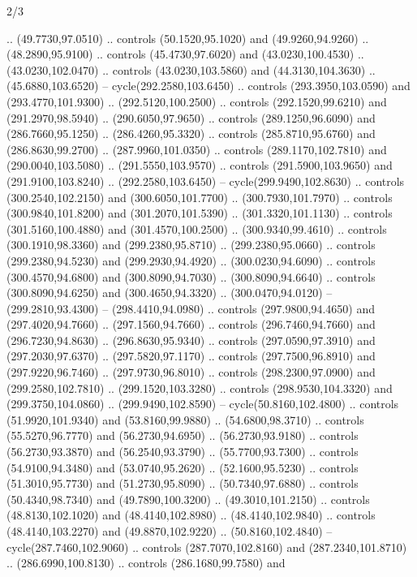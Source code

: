 \begin{flagdescription}{2/3}
\begin{scope}[xshift=0.5\flaglength,yshift=0.5\flagwidth,scale=\stretchfactor]
\begin{scope}[scale=0.001645\flagwidth,yshift=65mm,xshift=-63mm]
\begin{scope}[y=0.80pt, x=0.80pt, yscale=-1,]
\begin{scope}[cm={{1.33333,0.0,0.0,1.33333,(0.0,1e-05)}}]
  .. (49.7730,97.0510) .. controls (50.1520,95.1020) and (49.9260,94.9260) ..
  (48.2890,95.9100) .. controls (45.4730,97.6020) and (43.0230,100.4530) ..
  (43.0230,102.0470) .. controls (43.0230,103.5860) and (44.3130,104.3630) ..
  (45.6880,103.6520) -- cycle(292.2580,103.6450) .. controls (293.3950,103.0590)
  and (293.4770,101.9300) .. (292.5120,100.2500) .. controls (292.1520,99.6210)
  and (291.2970,98.5940) .. (290.6050,97.9650) .. controls (289.1250,96.6090)
  and (286.7660,95.1250) .. (286.4260,95.3320) .. controls (285.8710,95.6760)
  and (286.8630,99.2700) .. (287.9960,101.0350) .. controls (289.1170,102.7810)
  and (290.0040,103.5080) .. (291.5550,103.9570) .. controls (291.5900,103.9650)
  and (291.9100,103.8240) .. (292.2580,103.6450) -- cycle(299.9490,102.8630) ..
  controls (300.2540,102.2150) and (300.6050,101.7700) .. (300.7930,101.7970) ..
  controls (300.9840,101.8200) and (301.2070,101.5390) .. (301.3320,101.1130) ..
  controls (301.5160,100.4880) and (301.4570,100.2500) .. (300.9340,99.4610) ..
  controls (300.1910,98.3360) and (299.2380,95.8710) .. (299.2380,95.0660) ..
  controls (299.2380,94.5230) and (299.2930,94.4920) .. (300.0230,94.6090) ..
  controls (300.4570,94.6800) and (300.8090,94.7030) .. (300.8090,94.6640) ..
  controls (300.8090,94.6250) and (300.4650,94.3320) .. (300.0470,94.0120) --
  (299.2810,93.4300) -- (298.4410,94.0980) .. controls (297.9800,94.4650) and
  (297.4020,94.7660) .. (297.1560,94.7660) .. controls (296.7460,94.7660) and
  (296.7230,94.8630) .. (296.8630,95.9340) .. controls (297.0590,97.3910) and
  (297.2030,97.6370) .. (297.5820,97.1170) .. controls (297.7500,96.8910) and
  (297.9220,96.7460) .. (297.9730,96.8010) .. controls (298.2300,97.0900) and
  (299.2580,102.7810) .. (299.1520,103.3280) .. controls (298.9530,104.3320) and
  (299.3750,104.0860) .. (299.9490,102.8590) -- cycle(50.8160,102.4800) ..
  controls (51.9920,101.9340) and (53.8160,99.9880) .. (54.6800,98.3710) ..
  controls (55.5270,96.7770) and (56.2730,94.6950) .. (56.2730,93.9180) ..
  controls (56.2730,93.3870) and (56.2540,93.3790) .. (55.7700,93.7300) ..
  controls (54.9100,94.3480) and (53.0740,95.2620) .. (52.1600,95.5230) ..
  controls (51.3010,95.7730) and (51.2730,95.8090) .. (50.7340,97.6880) ..
  controls (50.4340,98.7340) and (49.7890,100.3200) .. (49.3010,101.2150) ..
  controls (48.8130,102.1020) and (48.4140,102.8980) .. (48.4140,102.9840) ..
  controls (48.4140,103.2270) and (49.8870,102.9220) .. (50.8160,102.4840) --
  cycle(287.7460,102.9060) .. controls (287.7070,102.8160) and
  (287.2340,101.8710) .. (286.6990,100.8130) .. controls (286.1680,99.7580) and

\end{scope}
\end{scope}
\end{scope}
\end{scope}
\end{flagdescription}
